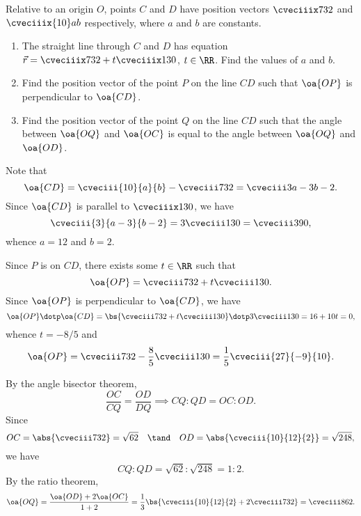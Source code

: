 \begin{problem}
    Relative to an origin $O$, points $C$ and $D$ have position vectors $\cveciiix732$ and $\cveciiix{10}ab$ respectively, where $a$ and $b$ are constants.

    \begin{enumerate}
        \item The straight line through $C$ and $D$ has equation $\vec r = \cveciiix732 + t\cveciiix130$, $t \in \RR$. Find the values of $a$ and $b$.
        \item Find the position vector of the point $P$ on the line $CD$ such that $\oa{OP}$ is perpendicular to $\oa{CD}$.
        \item Find the position vector of the point $Q$ on the line $CD$ such that the angle between $\oa{OQ}$ and $\oa{OC}$ is equal to the angle between $\oa{OQ}$ and $\oa{OD}$.
    \end{enumerate}
\end{problem}
\begin{solution}
    \begin{ppart}
        Note that \[\oa{CD} = \cveciii{10}{a}{b} - \cveciii732 = \cveciii3{a-3}{b-2}.\] Since $\oa{CD}$ is parallel to $\cveciiix130$, we have \[\cveciii{3}{a-3}{b-2} = 3\cveciii130 = \cveciii390,\] whence $a = 12$ and $b = 2$.
    \end{ppart}
    \begin{ppart}
        Since $P$ is on $CD$, there exists some $t \in \RR$ such that \[\oa{OP} = \cveciii732 + t \cveciii130.\] Since $\oa{OP}$ is perpendicular to $\oa{CD}$, we have \[\oa{OP} \dotp \oa{CD} = \bs{\cveciii732 + t\cveciii130} \dotp 3\cveciii130 = 16 + 10t = 0,\] whence $t = -8/5$ and \[\oa{OP} = \cveciii732 - \frac85 \cveciii130 = \frac15 \cveciii{27}{-9}{10}.\]
    \end{ppart}
    \begin{ppart}
        By the angle bisector theorem, \[\frac{OC}{CQ} = \frac{OD}{DQ} \implies CQ:QD = OC : OD.\] Since \[OC = \abs{\cveciii732} = \sqrt{62} \quad \tand \quad OD = \abs{\cveciii{10}{12}{2}} = \sqrt{248},\] we have \[CQ : QD = \sqrt{62} : \sqrt{248} = 1 : 2.\] By the ratio theorem, \[\oa{OQ} = \frac{\oa{OD} + 2 \oa{OC}}{1 + 2} = \frac13 \bs{\cveciii{10}{12}{2} + 2\cveciii732} = \cveciii862.\]
    \end{ppart}
\end{solution}

